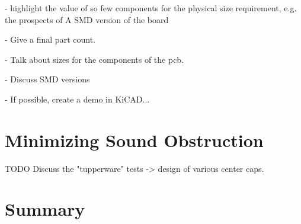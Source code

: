- highlight the value of so few components for the physical size
requirement, e.g. the prospects of A SMD version of the board

- Give a final part count.

- Talk about sizes for the components of the pcb.

- Discuss SMD versions

- If possible, create a demo in KiCAD...

\section{Minimizing Sound Obstruction}

TODO Discuss the "tupperware" tests -> design of various center caps.

\section{Summary}
